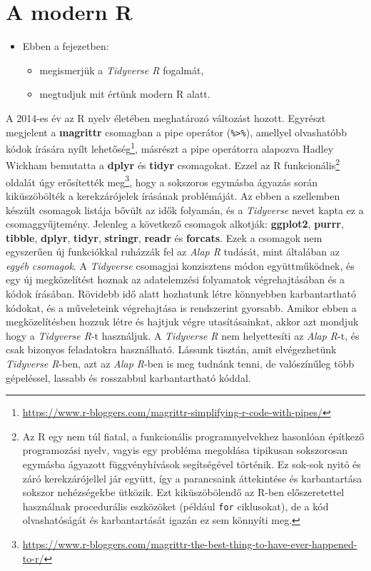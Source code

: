 \documentclass[
]{book}
\providecommand{\tightlist}{%
  \setlength{\itemsep}{0pt}\setlength{\parskip}{0pt}}
\newenvironment{rmdblock}[1]
  {\begin{shaded*}
  \begin{itemize}
  \renewcommand{\labelitemi}{
    \raisebox{-.7\height}[0pt][0pt]{
      {\setkeys{Gin}{width=3em,keepaspectratio}\texttt{[image: images/\#1]}}
    }
  }
  \item
  }
  {
  \end{itemize}
  \end{shaded*}
  }
\newenvironment{rmdlevel2}
  {\begin{rmdblock}{level2}}
  {\end{rmdblock}}
\begin{document}
\hypertarget{a-modern-r}{%
\section{A modern R}\label{a-modern-r}}

\begin{rmdlevel2}
Ebben a fejezetben:

\begin{itemize}
\tightlist
\item
  megismerjük a \emph{Tidyverse R} fogalmát,
\item
  megtudjuk mit értünk modern R alatt.
\end{itemize}
\end{rmdlevel2}

A 2014-es év az R nyelv életében meghatározó változást hozott. Egyrészt megjelent a \textbf{magrittr} csomagban a pipe operátor (\texttt{\%\textgreater{}\%}), amellyel olvashatóbb kódok írására nyílt lehetőség\footnote{\url{https://www.r-bloggers.com/magrittr-simplifying-r-code-with-pipes/}}, másrészt a pipe operátorra alapozva Hadley Wickham bemutatta a \textbf{dplyr} és \textbf{tidyr} csomagokat. Ezzel az R funkcionális\footnote{Az R egy nem túl fiatal, a funkcionális programnyelvekhez hasonlóan építkező programozási nyelv, vagyis egy probléma megoldása tipikusan sokszorosan egymásba ágyazott függvényhívások segítségével történik. Ez sok-sok nyitó és záró kerekzárójellel jár együtt, így a parancsaink áttekintése és karbantartása sokszor nehézségekbe ütközik. Ezt kiküszöbölendő az R-ben előszeretettel használnak procedurális eszközöket (például \texttt{for} ciklusokat), de a kód olvashatóságát és karbantartását igazán ez sem könnyíti meg.} oldalát úgy erősítették meg\footnote{\url{https://www.r-bloggers.com/magrittr-the-best-thing-to-have-ever-happened-to-r/}}, hogy a sokszoros egymásba ágyazás során kiküszöbölték a kerekzárójelek írásának problémáját. Az ebben a szellemben készült csomagok listája bővült az idők folyamán, és a \emph{Tidyverse} nevet kapta ez a csomaggyűjtemény. Jelenleg a következő csomagok alkotják: \textbf{ggplot2}, \textbf{purrr}, \textbf{tibble}, \textbf{dplyr}, \textbf{tidyr}, \textbf{stringr}, \textbf{readr} és \textbf{forcats}. Ezek a csomagok nem egyszerűen új funkciókkal ruházzák fel az \emph{Alap R} tudását, mint általában az \emph{egyéb csomagok}. A \emph{Tidyverse} csomagjai konzisztens módon együttműködnek, és egy új megközelítést hoznak az adatelemzési folyamatok végrehajtásában és a kódok írásában. Rövidebb idő alatt hozhatunk létre könnyebben karbantartható kódokat, és a műveleteink végrehajtása is rendszerint gyorsabb. Amikor ebben a megközelítésben hozzuk létre és hajtjuk végre utasításainkat, akkor azt mondjuk hogy a \emph{Tidyverse R}-t használjuk. A \emph{Tidyverse R} nem helyettesíti az \emph{Alap R}-t, és csak bizonyos feladatokra használható. Lássunk tisztán, amit elvégezhetünk \emph{Tidyverse R}-ben, azt az \emph{Alap R}-ben is meg tudnánk tenni, de valószínűleg több gépeléssel, lassabb és rosszabbul karbantartható kóddal.
\end{document}
